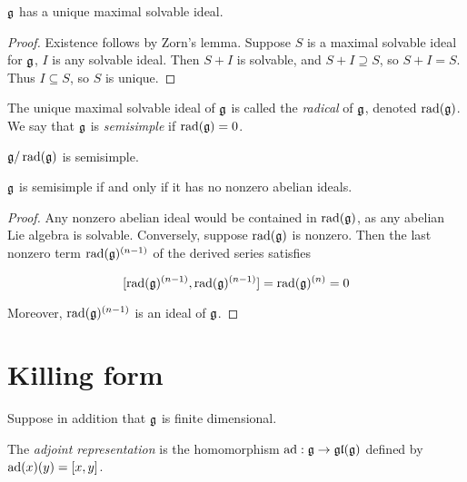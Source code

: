 \documentclass{article}
\DeclareMathOperator{\rad}{rad}
\begin{document}
\begin{proposition}
    \(\mathfrak{g}\) has a unique maximal solvable ideal.
\end{proposition}

\begin{proof}
    Existence follows by Zorn's lemma. Suppose \(S\) is a maximal solvable ideal for \(\mathfrak{g}\), \(I\) is any solvable ideal. Then \(S + I\) is solvable, and \(S + I \supseteq S\), so \(S + I = S\). Thus \(I \subseteq S\), so \(S\) is unique.
\end{proof}

\begin{definition}
     The unique maximal solvable ideal of \(\mathfrak{g}\) is called the \emph{radical} of \(\mathfrak{g}\), denoted \(\rad(\mfg)\). We say that \(\mathfrak{g}\) is \emph{semisimple} if \(\rad(\mfg) = 0\).
\end{definition}

\begin{lemma}
    \(\mfg/\rad(\mfg)\) is semisimple.
\end{lemma}

\begin{proposition}
    \(\mathfrak{g}\) is semisimple if and only if it has no nonzero abelian ideals.
\end{proposition}

\begin{proof}
    Any nonzero abelian ideal would be contained in \(\rad(\mfg)\), as any abelian Lie algebra is solvable. Conversely, suppose \(\rad(\mfg)\) is nonzero. Then the last nonzero term \(\rad(\mfg)^{(n-1)}\) of the derived series satisfies

    \[[\rad(\mfg)^{(n-1)}, \rad(\mfg)^{(n-1)}] = \rad(\mfg)^{(n)} = 0\]

    Moreover, \(\rad(\mfg)^{(n-1)}\) is an ideal of \(\mathfrak{g}\).
\end{proof}

\section{Killing form}

Suppose in addition that \(\mathfrak{g}\) is finite dimensional.

\begin{definition}
     The \emph{adjoint representation} is the homomorphism \(\operatorname{ad} : \mathfrak{g} \to \mathfrak{g}\mathfrak{l}(\mathfrak{g})\) defined by \(\operatorname{ad}(x)(y) = [x, y]\).
\end{definition}
\end{document}

